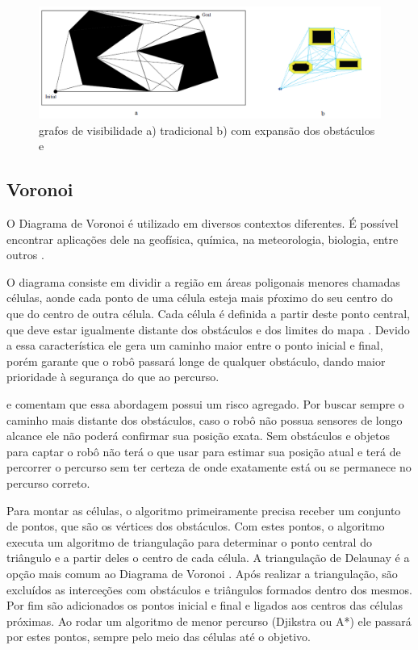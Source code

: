 \begin{figure}[h]
	\centering
	\label{fig08}
		\includegraphics[keepaspectratio=true,scale=0.6]{figuras/7visibilityGraph.png}
	\caption{grafos de visibilidade a) tradicional b) com expansão dos obstáculos \cite{Thomsen2010} e \cite{MRIT_SITE}}
\end{figure}

\subsection{Voronoi}

O Diagrama de Voronoi é utilizado em diversos contextos diferentes. É possível encontrar aplicações dele na geofísica, química, na meteorologia, biologia, entre outros \cite{VORONOI_SITE}.

O diagrama consiste em dividir a região em áreas poligonais menores chamadas células, aonde cada ponto de uma célula esteja mais pŕoximo do seu centro do que do centro de outra célula. Cada célula é definida a partir deste ponto central, que deve estar igualmente distante dos obstáculos e dos limites do mapa \cite{Guzman2008}. Devido a essa característica ele gera um caminho maior entre o ponto inicial e final, porém garante que o robô passará longe de qualquer obstáculo, dando maior prioridade à segurança do que ao percurso.

\cite{Siegwart2004} e \cite{Choset2005} comentam que essa abordagem possui um risco agregado. Por buscar sempre o caminho mais distante dos obstáculos, caso o robô não possua sensores de longo alcance ele não poderá confirmar sua posição exata. Sem obstáculos e objetos para captar o robô não terá o que usar para estimar sua posição atual e terá de percorrer o percurso sem ter certeza de onde exatamente está ou se permanece no percurso correto.

Para montar as células, o algoritmo primeiramente precisa receber um conjunto de pontos, que são os vértices dos obstáculos. Com estes pontos, o algoritmo executa um algoritmo de triangulação para determinar o ponto central do triângulo e a partir deles o centro de cada célula. A triangulação de Delaunay é a opção mais comum ao Diagrama de Voronoi \cite{Souza2008}. Após realizar a triangulação, são excluídos as interceções com obstáculos e triângulos formados dentro dos mesmos. Por fim são adicionados os pontos inicial e final e ligados aos centros das células próximas. Ao rodar um algoritmo de menor percurso (Djikstra ou A*) ele passará por estes pontos, sempre pelo meio das células até o objetivo.

